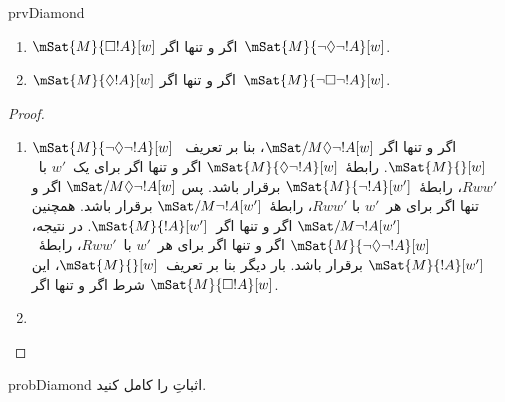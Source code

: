 \documentclass[../../../include/open-logic-section]{subfiles}
\begin{document}
\begin{tagblock}{prvDiamond}
\begin{prop}
  \begin{enumerate}
  \item $\mSat{M}{\Box !A}[w]$ اگر و تنها اگر~$\mSat{M}{\lnot\Diamond\lnot !A}[w]$.
  \item $\mSat{M}{\Diamond !A}[w]$ اگر و تنها اگر~$\mSat{M}{\lnot\Box\lnot !A}[w]$.
  \end{enumerate}
\end{prop}

\begin{proof}
  \begin{enumerate}
    \item $\mSat{M}{\lnot\Diamond\lnot !A}[w]$ اگر و تنها اگر
      $\mSat/{M}{\Diamond\lnot !A}[w]$، بنا بر تعریف~$\mSat{M}{}[w]$.
      رابطهٔ~$\mSat{M}{\Diamond\lnot !A}[w]$ اگر و تنها اگر برای یک~$w'$
      با~$Rww'$، رابطهٔ~$\mSat{M}{\lnot !A}[w']$ برقرار باشد. پس
      $\mSat/{M}{\Diamond\lnot !A}[w]$ اگر و تنها اگر برای هر~$w'$ با
      $Rww'$، رابطهٔ~$\mSat/{M}{\lnot !A}[w']$ برقرار باشد. همچنین
      $\mSat/{M}{\lnot !A}[w']$ اگر و تنها اگر~$\mSat{M}{!A}[w']$.
      در نتیجه، $\mSat{M}{\lnot\Diamond\lnot !A}[w]$ اگر و تنها اگر
      برای هر~$w'$ با~$Rww'$، رابطهٔ~$\mSat{M}{!A}[w']$ برقرار باشد.
      بار دیگر بنا بر تعریف~$\mSat{M}{}[w]$، این شرط اگر و تنها اگر
      $\mSat{M}{\Box !A}[w]$.
    \item {}
  \end{enumerate}
\end{proof}

\begin{probtag}{probDiamond}
  اثباتِ  را کامل کنید.
\end{probtag}
\end{tagblock}
\end{document}
